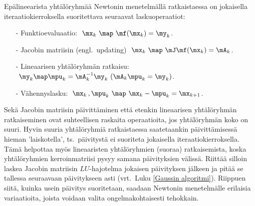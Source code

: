 Epälineearista yhtälöryhmää Newtonin menetelmällä ratkaistaessa on jokaisella 
iteraatiokierroksella suoritettava seuraavat laskuoperaatiot:
\begin{itemize}
\item[-] Funktioevaluaatio: $\ \mx_k\ \map\ \mf(\mx_k)=\my_k$.
\item[-] Jacobin matriisin  (engl.\ updating) 
         $\ \mx_k\ \map\ \mJ\mf(\mx_k)=\mA_k$. 
\item[-] Lineaarisen yhtälöryhmän ratkaisu: 
         $\ \my_k\map\mpu_k=\mA_k^{-1}\my_k\ (\mA_k\mpu_k=\my_k)$.
\item[-] Vähennyslasku: $\ \mx_k\,,\mpu_k\ \map\ \mx_k-\mpu_k=\mx_{k+1}$.
\end{itemize}
Sekä Jacobin matriisin päivittäminen että etenkin lineaarisen yhtälöryhmän ratkaiseminen ovat
suhteellisen raskaita operaatioita, jos yhtälöryhmän koko on suuri. Hyvin suuria yhtälöryhmiä
ratkaistaessa saatetaankin päivittämisessä hieman 'laiskotella', ts.\ päivitystä ei suoriteta
jokaisella iteraatiokierroksella. Tämä helpottaa myös lineaaristen yhtälöryhmien (suoraa) 
ratkaisemista, koska yhtälöryhmien kerroinmatriisi pysyy samana päivityksien välissä. Riittää
silloin laskea Jacobin matriisin $LU$-hajotelma jokaisen päivityksen jälkeen ja pitää se tallessa
seuraavaan päivitykseen asti (vrt.\ Luku \ref{Gaussin algoritmi}). Riippuen siitä, kuinka usein
päivitys suoritetaan, saadaan Newtonin menetelmälle erilaisia variaatioita, joista voidaan 
valita ongelmakohtaisesti tehokkain.

